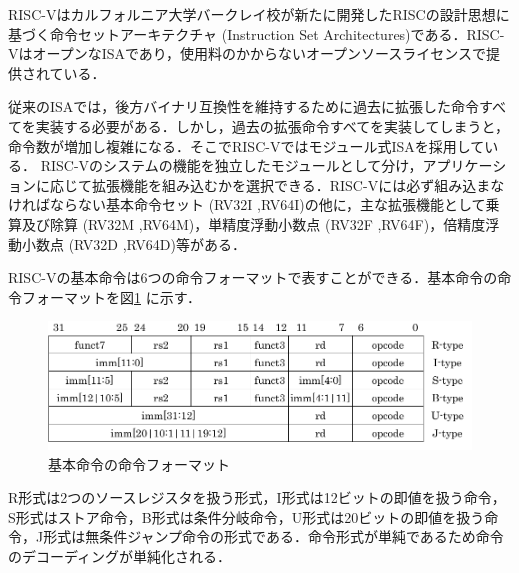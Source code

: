 
RISC-Vはカルフォルニア大学バークレイ校が新たに開発したRISCの設計思想に基づく命令セットアーキテクチャ (Instruction Set Architectures)である．RISC-VはオープンなISAであり，使用料のかからないオープンソースライセンスで提供されている．

従来のISAでは，後方バイナリ互換性を維持するために過去に拡張した命令すべてを実装する必要がある．しかし，過去の拡張命令すべてを実装してしまうと，命令数が増加し複雑になる．そこでRISC-Vではモジュール式ISAを採用している\cite{bib:risc-v-module}．
RISC-Vのシステムの機能を独立したモジュールとして分け，アプリケーションに応じて拡張機能を組み込むかを選択できる．RISC-Vには必ず組み込まなければならない基本命令セット (RV32I ,RV64I)の他に，主な拡張機能として乗算及び除算 (RV32M ,RV64M)，単精度浮動小数点 (RV32F ,RV64F)，倍精度浮動小数点 (RV32D ,RV64D)等がある．

RISC-Vの基本命令は6つの命令フォーマットで表すことができる．基本命令の命令フォーマットを図\ref{fig:RISC-V_Instruction_formats}
に示す．

\begin{figure}
    \centering
    \includegraphics[scale=0.8]{image/Inst_Format.pdf}
    \caption{基本命令の命令フォーマット}
    \label{fig:RISC-V_Instruction_formats}
\end{figure}

R形式は2つのソースレジスタを扱う形式，I形式は12ビットの即値を扱う命令，S形式はストア命令，B形式は条件分岐命令，U形式は20ビットの即値を扱う命令，J形式は無条件ジャンプ命令の形式である．命令形式が単純であるため命令のデコーディングが単純化される．